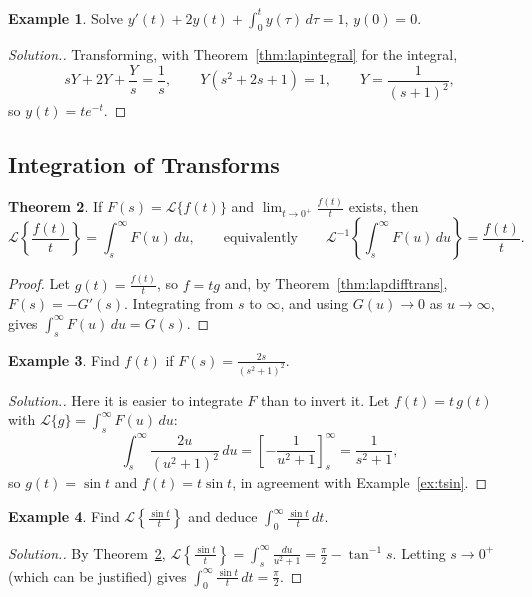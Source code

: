 \documentclass[11pt,a4paper]{article}
\theoremstyle{definition}
\newtheorem{thm}{Theorem}[subsection]
\newtheorem{exa}[thm]{Example}
\newenvironment{solution}
  {\renewcommand{\qedsymbol}{}\begin{proof}[\textit{Solution}.]}
  {\end{proof}}
\begin{document}
\begin{exa}
\label{ex:integrodiff}
Solve $y'(t) + 2y(t) + \int_0^t y(\tau)\,d\tau = 1$, $y(0) = 0$.
\end{exa}

\begin{solution}
Transforming, with Theorem~\ref{thm:lapintegral} for the integral,
\[sY + 2Y + \frac{Y}{s} = \frac1s,\qquad Y(s^2 + 2s + 1) = 1,\qquad Y =
\frac{1}{(s + 1)^2},\]
so $y(t) = te^{-t}$.
\end{solution}

{\color[wave]{485}\subsection{Integration of Transforms}}

\begin{thm}
\label{thm:lapinttrans}
If $F(s) = \mathcal{L}\{f(t)\}$ and $\lim_{t\to 0^+}\frac{f(t)}{t}$ exists, then
\[\mathcal{L}\left\{\frac{f(t)}{t}\right\}=\int^{\infty}_s F(u)\,du,\qquad
\text{equivalently}\qquad \mathcal{L}^{-1}\left\{\int^{\infty}_s
F(u)\,du\right\} = \frac{f(t)}{t} .\]
\end{thm}

\begin{proof}
Let $g(t) = \frac{f(t)}{t}$, so $f = tg$ and, by Theorem~\ref{thm:lapdifftrans},
$F(s) = -G'(s)$. Integrating from $s$ to $\infty$, and using $G(u)\to 0$ as
$u\to\infty$, gives $\int_s^\infty F(u)\,du = G(s)$.
\end{proof}

\begin{exa}
\label{ex:lapinttrans}
Find $f(t)$ if $F(s) = \frac{2s}{(s^2 + 1)^2}$.
\end{exa}

\begin{solution}
Here it is easier to integrate $F$ than to invert it. Let $f(t) = t\,g(t)$ with
$\mathcal{L}\{g\} = \int_s^\infty F(u)\,du$:
\[\int^{\infty}_s \frac{2u}{(u^2 + 1)^2}\,du = \left[-\frac{1}{u^2 +
1}\right]^{\infty}_s = \frac{1}{s^2 + 1} ,\]
so $g(t) = \sin t$ and $f(t) = t \sin t$, in agreement with
Example~\ref{ex:tsin}.
\end{solution}

\begin{exa}
\label{ex:sinc}
Find $\mathcal{L}\left\{\frac{\sin t}{t}\right\}$ and deduce
$\int_0^\infty\frac{\sin t}{t}\,dt$.
\end{exa}

\begin{solution}
By Theorem~\ref{thm:lapinttrans},
$\mathcal{L}\left\{\frac{\sin t}{t}\right\} = \int_s^\infty\frac{du}{u^2 + 1} =
\frac{\pi}{2} - \tan^{-1}s$. Letting $s\to 0^+$ (which can be justified) gives
$\int_0^\infty\frac{\sin t}{t}\,dt = \frac{\pi}{2}$.
\end{solution}
\end{document}
